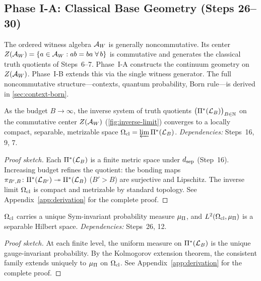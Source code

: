 \subsection{Phase I-A: Classical Base Geometry (Steps 26--30)}
\label{sec:derivation:geometry}

\begin{remark}
\label{rem:center-first}
The ordered witness algebra $\mathcal{A}_W$ is generally noncommutative.  Its
center $Z(\mathcal{A}_W) = \{a \in \mathcal{A}_W : ab = ba \;\forall\, b\}$
is commutative and generates the classical truth quotients of Steps~6--7.
Phase~I-A constructs the continuum geometry on $Z(\mathcal{A}_W)$.  Phase~I-B
extends this via the single witness generator.  The full noncommutative
structure---contexts, quantum probability, Born rule---is derived in
\cref{sec:context-born}.
\end{remark}

\begin{theorem}
\label{thm:continuum-limit}
As the budget $B \to \infty$, the inverse system of truth quotients
$\bigl(\Pi^*(\mathcal{L}_B)\bigr)_{B \in \mathbb{N}}$ on the commutative center
$Z(\mathcal{A}_W)$ (\cref{fig:inverse-limit}) converges to a locally compact,
separable, metrizable space $\Omega_{\mathrm{cl}} = \varprojlim \Pi^*(\mathcal{L}_B)$.
\emph{Dependencies:} Steps~16, 9, 7.
\begin{proof}[Proof sketch]
Each $\Pi^*(\mathcal{L}_B)$ is a finite metric space under $d_{\mathrm{sep}}$ (Step~16).
Increasing budget refines the quotient: the bonding maps
$\pi_{B',B} \colon \Pi^*(\mathcal{L}_{B'}) \twoheadrightarrow \Pi^*(\mathcal{L}_B)$
($B' > B$) are surjective and Lipschitz.  The inverse limit $\Omega_{\mathrm{cl}}$ is
compact and metrizable by standard topology.
See Appendix~\ref{app:derivation} for the complete proof.
\end{proof}
\end{theorem}



\begin{theorem}
\label{thm:l2-space}
$\Omega_{\mathrm{cl}}$ carries a unique $\mathrm{Sym}$-invariant probability measure
$\mu_\Pi$, and $L^2(\Omega_{\mathrm{cl}}, \mu_\Pi)$ is a separable Hilbert space.
\emph{Dependencies:} Steps~26, 12.
\begin{proof}[Proof sketch]
At each finite level, the uniform measure on $\Pi^*(\mathcal{L}_B)$
is the unique gauge-invariant probability.  By the
Kolmogorov extension theorem, the consistent family extends uniquely to
$\mu_\Pi$ on $\Omega_{\mathrm{cl}}$.
See Appendix~\ref{app:derivation} for the complete proof.
\end{proof}
\end{theorem}

